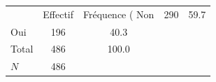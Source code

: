 {
\def\sym#1{\ifmmode^{#1}\else\(^{#1}\)\fi}
\begin{tabular}{l*{1}{cc}}
\toprule
            &    Effectif&Fréquence (%
\midrule
Non         &         290&        59.7\\
Oui         &         196&        40.3\\
Total       &         486&       100.0\\
\midrule
\(N\)       &         486&            \\
\bottomrule
\end{tabular}
}
